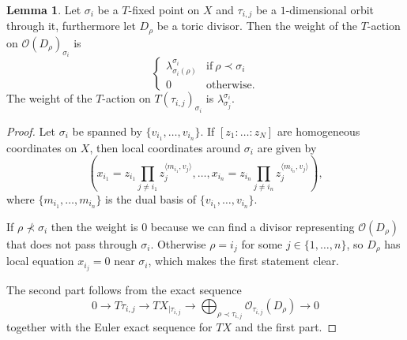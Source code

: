 \documentclass[11pt]{amsart}
\renewcommand{\to}{\rightarrow}
\theoremstyle{definition}
\newtheorem{lem}[thm]{Lemma}
\theoremstyle{definition}
\begin{document}
\begin{lem}
 Let $\sigma_i$ be a $T$-fixed point on $X$ and $\tau_{i,j}$ be a $1$-dimensional orbit through it, furthermore let $D_\rho$ be a toric divisor. Then the weight of the $T$-action on $\mathcal O(D_\rho)_{\sigma_i}$ is
 \[
  \begin{cases}
      \lambda^{\sigma_i}_{\sigma_i(\rho)} & \text{if}\ \rho\prec \sigma_i \\
      0 & \text{otherwise.}
    \end{cases}
 \]
The weight of the $T$-action on $T(\tau_{i,j})_{\sigma_i}$ is $\lambda^{\sigma_i}_{\sigma_j}$.
\end{lem}
\begin{proof}
 Let $\sigma_i$ be spanned by $\{v_{i_1},\ldots,v_{i_n}\}$. If $[z_1:\ldots:z_N]$ are homogeneous coordinates on $X$, then local coordinates around $\sigma_i$ are given by \[\left(x_{i_1}=z_{i_1}\prod_{j\neq i_1}z_j^{\langle m_{i_1},v_j\rangle},\ldots,x_{i_n}=z_{i_n}\prod_{j\neq i_n}z_j^{\langle m_{i_n},v_j\rangle}\right),\] where $\{m_{i_1},\ldots,m_{i_n}\}$ is the dual basis of $\{v_{i_1},\ldots,v_{i_n}\}$.
 
 If $\rho\nprec \sigma_i$ then the weight is $0$ because we can find a divisor representing $\mathcal O(D_\rho)$ that does not pass through $\sigma_i$. Otherwise $\rho=i_j$ for some $j\in\{1,\ldots,n\}$, so $D_{\rho}$ has local equation $x_{i_j}=0$ near $\sigma_i$, which makes the first statement clear.
 
 The second part follows from the exact sequence
 \[
  0\to T\tau_{i,j}\to TX_{|\tau_{i,j}}\to \bigoplus_{\rho\prec\tau_{i,j}}\mathcal O_{\tau_{i,j}}(D_{\rho})\to 0
 \]
together with the Euler exact sequence for $TX$ and the first part.
\end{proof}
\end{document}

